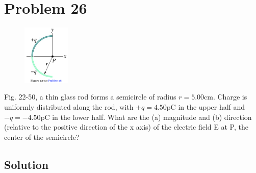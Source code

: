 \documentclass[12pt]{article}
\begin{document}
\section{Problem 26}
\begin{figure}
    \vspace{-30pt}
    \includegraphics[width=0.2\textwidth]{picture_6.png} 
\end{figure}
Fig. 22-50, a thin glass rod forms a semicircle of radius $r = 5.00 \unit{\centi\meter}$. Charge is uniformly distributed along the rod, with $+q = 4.50 \unit{\pico\coulomb}$ in the upper half and $-q = -4.50 \unit{\pico\coulomb}$ in the lower half. What are the (a) magnitude and (b) direction (relative to the positive direction of the x axis) of the electric field E at P, the center of the semicircle?

\subsection*{Solution}
\end{document}
